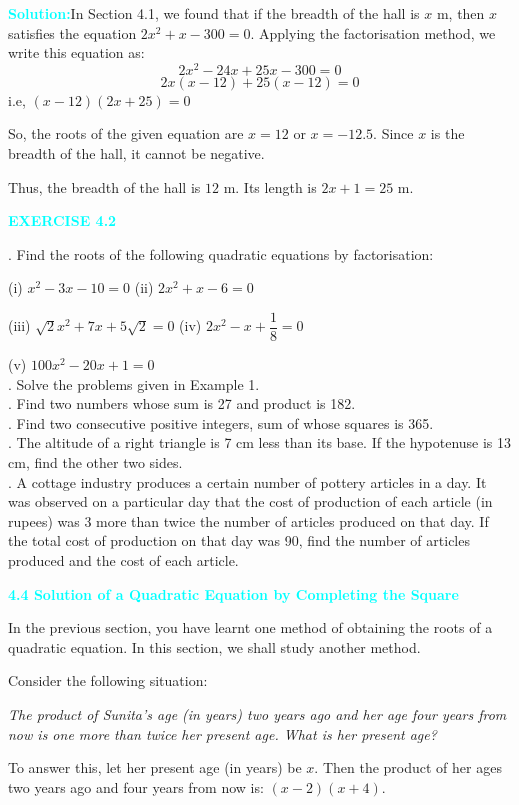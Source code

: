 \documentclass[a4paper,12pt]{article}
\begin{document}
\noindent\textcolor{cyan}{\textbf{Solution:}}In Section 4.1, we found that if the breadth of the hall is $x$ m, then $x$ satisfies the equation
$
2x^2 + x - 300 = 0.$
Applying the factorisation method, we write this equation as:
\[
2x^2 - 24x + 25x - 300 = 0
\]
\[
2x(x - 12) + 25(x - 12) = 0
\]
i.e, \hspace{12em}$
(x - 12)(2x + 25) = 0$

So, the roots of the given equation are $x = 12$ or $x = -12.5$. Since $x$ is the breadth of the hall, it cannot be negative.

Thus, the breadth of the hall is $12$ m. Its length is $2x + 1 = 25$ m.

\begin{center}
    \textcolor{cyan}{\textbf{EXERCISE 4.2}}
\end{center}

. Find the roots of the following quadratic equations by factorisation:

\hspace{1em}(i) $x^2 - 3x - 10 = 0$   \hspace{4em}(ii) $2x^2 + x - 6 = 0$ 

\hspace{1em}(iii) $\sqrt{2}x^2 + 7x + 5\sqrt{2} = 0$ 
\hspace{1em}(iv) $2x^2 - x + \dfrac{1}{8} = 0$ 

\hspace{1em}(v) $100x^2 - 20x + 1 = 0$ \\
. Solve the problems given in Example 1. \\
. Find two numbers whose sum is 27 and product is 182. \\
. Find two consecutive positive integers, sum of whose squares is 365. \\
. The altitude of a right triangle is 7 cm less than its base. If the hypotenuse is 13 cm, find the other two sides. \\
. A cottage industry produces a certain number of pottery articles in a day. It was observed on a particular day that the cost of production of each article (in rupees) was 3 more than twice the number of articles produced on that day. If the total cost of production on that day was 90, find the number of articles produced and the cost of each article.

\vspace{1em}
\noindent\textcolor{cyan}{\textbf{4.4 Solution of a Quadratic Equation by Completing the Square}}

In the previous section, you have learnt one method of obtaining the roots of a quadratic equation. In this section, we shall study another method.

Consider the following situation:

\textit{The product of Sunita’s age (in years) two years ago and her age four years from now is one more than twice her present age. What is her present age?}

To answer this, let her present age (in years) be $x$. Then the product of her ages two years ago and four years from now is:
$(x - 2)(x + 4).$
\end{document}
